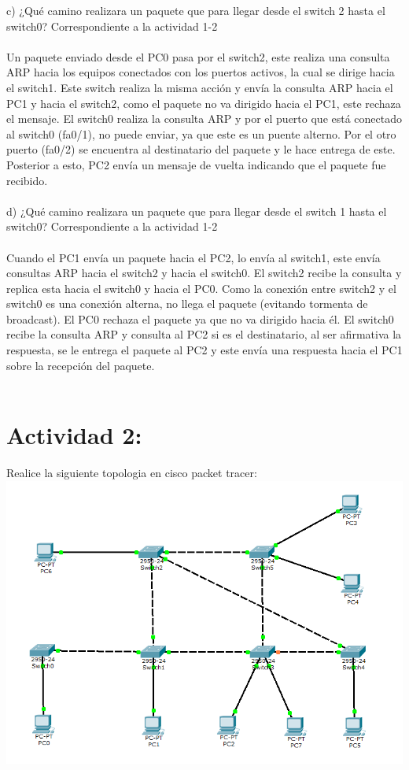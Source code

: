 \documentclass{article}
\begin{document}
c) ¿Qué camino realizara un paquete que para llegar desde el switch 2 hasta el
switch0? Correspondiente a la actividad 1-2\\\\
Un paquete enviado desde el PC0 pasa por el switch2, este realiza una consulta ARP hacia los equipos conectados con los puertos activos, la cual se dirige hacia el switch1. Este switch realiza la misma acción y envía la consulta ARP hacia el PC1 y hacia el switch2, como el paquete no va dirigido hacia el PC1, este rechaza el mensaje. El switch0 realiza la consulta ARP y por el puerto que está conectado al switch0 (fa0/1), no puede enviar, ya que este es un puente alterno. Por el otro puerto (fa0/2) se encuentra al destinatario del paquete y le hace entrega de este. Posterior a esto, PC2 envía un mensaje de vuelta indicando que el paquete fue recibido.\\\\
d) ¿Qué camino realizara un paquete que para llegar desde el switch 1 hasta el
switch0? Correspondiente a la actividad 1-2\\\\
Cuando el PC1 envía un paquete hacia el PC2, lo envía al switch1, este envía consultas ARP hacia el switch2 y hacia el switch0. El switch2 recibe la consulta y replica esta hacia el switch0 y hacia el PC0. Como la conexión entre switch2 y el switch0 es una conexión alterna, no llega el paquete (evitando tormenta de broadcast). El PC0 rechaza el paquete ya que no va dirigido hacia él. El switch0 recibe la consulta ARP y consulta al PC2 si es el destinatario, al ser afirmativa la respuesta, se le entrega el paquete al PC2 y este envía una respuesta hacia el PC1 sobre la recepción del paquete.\\\\


\section{Actividad 2:}
Realice la siguiente topologia en cisco packet tracer:\\
\includegraphics[scale=0.6]{stp2.png}\\\\
\end{document}
